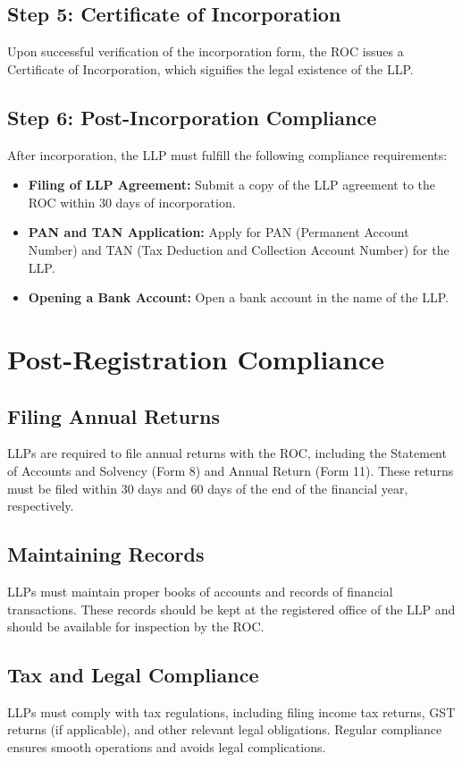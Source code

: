 \documentclass{article}
\begin{document}
\section{Step 5: Certificate of Incorporation}
Upon successful verification of the incorporation form, the ROC issues a Certificate of Incorporation, which signifies the legal existence of the LLP.

\section{Step 6: Post-Incorporation Compliance}
After incorporation, the LLP must fulfill the following compliance requirements:
\begin{itemize}
    \item \textbf{Filing of LLP Agreement:} Submit a copy of the LLP agreement to the ROC within 30 days of incorporation.
    \item \textbf{PAN and TAN Application:} Apply for PAN (Permanent Account Number) and TAN (Tax Deduction and Collection Account Number) for the LLP.
    \item \textbf{Opening a Bank Account:} Open a bank account in the name of the LLP.
\end{itemize}

\chapter{Post-Registration Compliance}
\section{Filing Annual Returns}
LLPs are required to file annual returns with the ROC, including the Statement of Accounts and Solvency (Form 8) and Annual Return (Form 11). These returns must be filed within 30 days and 60 days of the end of the financial year, respectively.

\section{Maintaining Records}
LLPs must maintain proper books of accounts and records of financial transactions. These records should be kept at the registered office of the LLP and should be available for inspection by the ROC.

\section{Tax and Legal Compliance}
LLPs must comply with tax regulations, including filing income tax returns, GST returns (if applicable), and other relevant legal obligations. Regular compliance ensures smooth operations and avoids legal complications.
\end{document}
